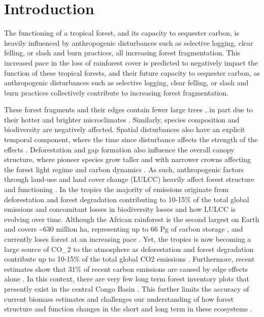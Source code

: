 \documentclass[remote sensing,article,submit,moreauthors,pdftex,10pt,a4paper]{mdpi}
\begin{document}

\hypertarget{introduction}{%
\section{Introduction}\label{introduction}}

The functioning of a tropical forest, and its capacity to sequester
carbon, is heavily influenced by anthropogenic disturbances such as
selective logging, clear felling, or slash and burn practices, all
increasing forest fragmentation. This increased pace in the loss of
rainforest cover \citep{butsic2015} is predicted to negatively impact
the function of these tropical forests, and their future capacity to
sequester carbon, as anthropogenic disturbances such as selective
logging, clear felling, or slash and burn practices collectively
contribute to increasing forest fragmentation.

These forest fragments and their edges contain fewer large trees
\citep{laurance2000}, in part due to their hotter and brighter
microclimates \citep{magnago2015}. Similarly, species composition and
biodiversity \citep{poorter2006} are negatively affected. Spatial
disturbances also have an explicit temporal component, where the time
since disturbance affects the strength of the effects
\citep{didham1999}. Deforestation and gap formation also influence the
overall canopy structure, where pioneer species grow taller and with
narrower crowns \citep{poorter2006, peres2006} affecting the forest
light regime and carbon dynamics \citep{stark2012}. As such,
anthropogenic factors through land-use and land cover change (LULCC)
heavily affect forest structure and functioning
\citep{fauset2017, brinck2017, didham1999}. In the tropics the majority
of emissions originate from deforestation and forest degradation
\citep{hansen2013, houghton2012, tyukavina2015} contributing to 10-15\%
of the total global emissions \citep{vanderwerf2009} and concomitant
losses in biodiversity losses \citep{barlow2016, vandeperre2018} and how
LULCC is evolving over time. Although the African rainforest is the
second largest on Earth and covers \textasciitilde{}630 million ha,
representing up to 66 Pg of carbon storage \citep{Lewis2009b}, and
currently loses forest at an increasing pace \citep{butsic2015}. Yet,
the tropics is now becoming a large source of CO\_2 to the atmosphere as
deforestation and forest degradation
\citep{hansen2013, houghton2012, tyukavina2015} contribute up to 10-15\%
of the total global CO2 emissions \citep{vanderwerf2009}. Furthermore,
recent estimates show that 31\% of recent carbon emissions are caused by
edge effects alone \citep{brinck2017}. In this context, there are very
few long term forest inventory plots that presently exist in the central
Congo Basin \citep{Verbeeck2011a, lewis2013}. This further limits the
accuracy of current biomass estimates and challenges our understanding
of how forest structure and function changes in the short and long term
in these ecosystems \citep{Kearsley2013, Doetterl2015}.
\end{document}
